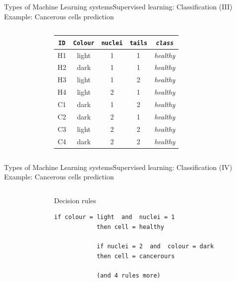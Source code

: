 \documentclass[10pt,compress]{beamer} %
\begin{document}
\begin{frame}{Types of Machine Learning systems}{Supervised learning: Classification (III)}
	Example: Cancerous cells prediction
	\begin{columns}
			\begin{figure}
			\centering{
			\resizebox{0.9\textwidth}{!}{}}
			\end{figure}


		\begin{center}
		\begin{tabular}{ccccc}\hline
		 \texttt{ID} & \texttt{Colour} & \texttt{nuclei}& \texttt{tails} & \texttt{\textit{class}} \\\hline
		 H1 & light  & 1     & 1     & \textit{healthy} \\
		 H2 & dark   & 1     & 1     & \textit{healthy} \\
		 H3 & light  & 1     & 2     & \textit{healthy} \\
		 H4 & light  & 2     & 1     & \textit{healthy} \\
		 C1 & dark   & 1     & 2     & \textit{healthy} \\
		 C2 & dark   & 2     & 1     & \textit{healthy} \\
		 C3 & light  & 2     & 2     & \textit{healthy} \\
		 C4 & dark   & 2     & 2     & \textit{healthy} \\
		 \hline
	 	\end{tabular}
	\end{center}
	\end{columns}
\end{frame}

\begin{frame}[fragile]{Types of Machine Learning systems}{Supervised learning: Classification (IV)}
	Example: Cancerous cells prediction
	\begin{columns}
 	   \column{.10\textwidth}
 	   \column{.20\textwidth}
			\begin{figure}
			\centering{
			\resizebox{0.9\textwidth}{!}{}}
			\end{figure}

 	   \column{.70\textwidth}
	   		\begin{exampleblock}{Decision rules}
	   		\begin{lstlisting}[firstnumber=1, xleftmargin=10pt] 
			if colour = light  and  nuclei = 1 
			then cell = healthy   	
			            
			if nuclei = 2  and  colour = dark
			then cell = cancerours

			(and 4 rules more)
	   		\end{lstlisting}
	   		\end{exampleblock}
	\end{columns}
\end{frame}
\end{document}
